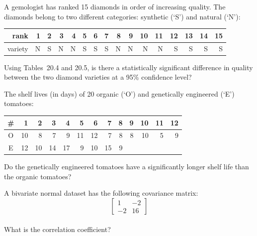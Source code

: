 \documentclass{article}
\begin{document}
\vspace{1cm}

\begin{minipage}{12cm}

  A gemologist has ranked 15 diamonds in order of increasing
  quality. The diamonds belong to two different categories: synthetic
  (`S') and natural (`N'):\medskip

    \begin{tabular}{@{}r@{~~}|r@{~~}r@{~~}r@{~~}r@{~~}r@{~~}r@{~~}r@{~~}r@{~~}r@{~~}r@{~~}r@{~~}r@{~~}r@{~~}r@{~~}r@{}}
      rank & 1 & 2 & 3 & 4 & 5 & 6 & 7 & 8 & 9 & 10 & 11 & 12 & 13 & 14 & 15 \\ \hline
      variety & N & S & N & N & S & S & S & N & N & N & N & S & S & S & S \\
    \end{tabular}\medskip

  Using Tables~20.4 and 20.5, is there a statistically significant
  difference in quality between the two diamond varieties at a 95\%
  confidence level?

\end{minipage}

\vspace{1cm}

\begin{minipage}{10cm}

  The shelf lives (in days) of 20 organic (`O') and genetically
  engineered (`E') tomatoes:\medskip

    \begin{tabular}{@{}c@{~~}|r@{~~}r@{~~}r@{~~}r@{~~}r@{~~}r@{~~}r@{~~}r@{~~}r@{~~}r@{~~}r@{~~}r@{}}
      \# & 1 & 2 & 3 & 4 & 5 & 6 & 7 & 8 & 9 & 10 & 11 & 12  \\ \hline
      O &  10 & 8 & 7 & 9 & 11 & 12 & 7 & 8 & 8 & 10 & 5 & 9 \\
      E & 12 & 10 & 14 & 17 & 9 & 10 & 15 & 9 & & & & \\
    \end{tabular}\medskip

  Do the genetically engineered tomatoes have a significantly longer
  shelf life than the organic tomatoes?

\end{minipage}

\vspace{1cm}

\begin{minipage}{10cm}

A bivariate normal dataset has the following covariance matrix:\\

\[ \left[\begin{array}{cc} 1 & -2 \\ -2 & 16 \end{array}\right] \]\\

What is the correlation coefficient?

\end{minipage}
\end{document}
